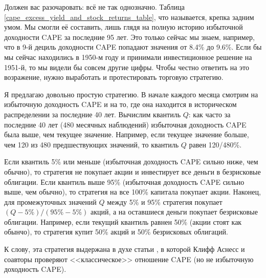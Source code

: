 Должен вас разочаровать: всё не так однозначно. Таблица \ref{cape_excess_yield_and_stock_returns_table}, что называется, крепка задним умом. Мы смогли её составить, лишь глядя на полную историю избыточной доходности CAPE за последние 95 лет. Это только сейчас мы знаем, например, что в 9-й дециль доходности CAPE попадают значения от 8.4\% до 9.6\%. Если бы мы сейчас находились в 1950-м году и принимали инвестиционное решение на 1951-й, то мы видели бы совсем другие цифры. Чтобы честно ответить на это возражение, нужно выработать и протестировать торговую стратегию.

Я предлагаю довольно простую стратегию. В начале каждого месяца смотрим на избыточную доходность CAPE и на то, где она находится в историческом распределении за последние 40 лет. Вычислим квантиль $Q$: как часто за последние 40 лет (480 месячных наблюдений) избыточная доходность CAPE была выше, чем текущее значение. Например, если текущее значение больше, чем 120 из 480 предшествующих значений, то квантиль $Q$ равен 120/480\%.

Если квантиль 5\% или меньше (избыточная доходность CAPE сильно ниже, чем обычно), то стратегия не покупает акции и инвестирует все деньги в безрисковые облигации. Если квантиль выше 95\% (избыточная доходность CAPE сильно выше, чем обычно), то стратегия на все 100\% капитала покупает акции. Наконец, для промежуточных значений $Q$ между 5\% и 95\% стратегия покупает $(Q - 5\%) / (95\% - 5\%)$ акций, а на оставшиеся деньги покупает безрисковые облигации. Например, если текущий квантиль равнен 50\% (акции стоят как обынчо), то стратегия купит 50\% акций и 50\% безрисковых облигаций.

К слову, эта стратегия выдержана в духе статьи \cite{asness2017market}, в которой Клифф Аснесс и соавторы проверяют <<классическое>> отношение CAPE (но не избыточную доходность CAPE).

